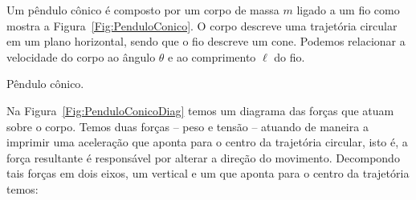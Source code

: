Um pêndulo cônico é composto por um corpo de massa $m$ ligado a um fio como mostra a Figura~\ref{Fig:PenduloConico}. O corpo descreve uma trajetória circular em um plano horizontal, sendo que o fio descreve um cone. Podemos relacionar a velocidade do corpo ao ângulo $\theta$ e ao comprimento $\ell$ do fio.

\begin{marginfigure}[-3cm]
\centering
{}
\caption{Pêndulo cônico.\label{Fig:PenduloConico}}
\end{marginfigure}

Na Figura~\ref{Fig:PenduloConicoDiag} temos um diagrama das forças que atuam sobre o corpo. Temos duas forças -- peso e tensão -- atuando de maneira a imprimir uma aceleração que aponta para o centro da trajetória circular, isto é, a força resultante é responsável por alterar a direção do movimento. Decompondo tais forças em dois eixos, um vertical e um que aponta para o centro da trajetória temos:

